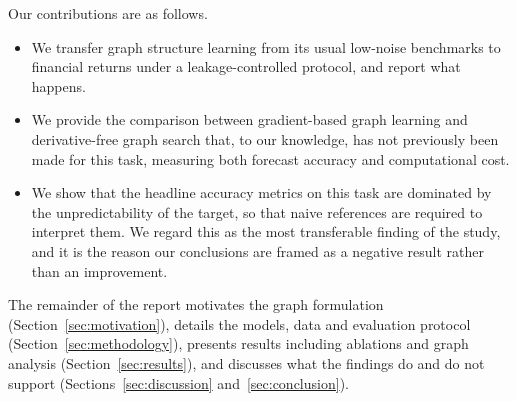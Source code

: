 Our contributions are as follows.

\begin{itemize}[nosep]
    \item We transfer graph structure learning from its usual low-noise benchmarks to financial returns under a leakage-controlled protocol, and report what happens.
    \item We provide the comparison between gradient-based graph learning and derivative-free graph search that, to our knowledge, has not previously been made for this task, measuring both forecast accuracy and computational cost.
    \item We show that the headline accuracy metrics on this task are dominated by the unpredictability of the target, so that naive references are required to interpret them. We regard this as the most transferable finding of the study, and it is the reason our conclusions are framed as a negative result rather than an improvement.
\end{itemize}

The remainder of the report motivates the graph formulation (Section~\ref{sec:motivation}), details the models, data and evaluation protocol (Section~\ref{sec:methodology}), presents results including ablations and graph analysis (Section~\ref{sec:results}), and discusses what the findings do and do not support (Sections~\ref{sec:discussion} and~\ref{sec:conclusion}).
